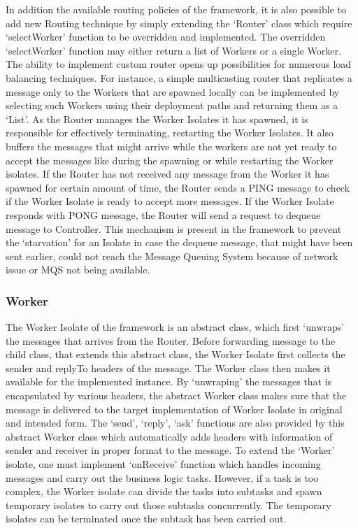     In addition the available routing policies of the framework, it is also possible to add new Routing technique by simply extending the ‘Router’ class which require ‘selectWorker’ function to be overridden and implemented. The overridden ‘selectWorker’ function may either return a list of Workers or a single Worker. The ability to implement custom router opens up possibilities for numerous load balancing techniques. For instance, a simple multicasting router that replicates a message only to the Workers that are spawned locally can be implemented by selecting such Workers using their deployment paths and returning them as a ‘List’.
    As the Router manages the Worker Isolates it has spawned, it is responsible for effectively terminating, restarting the Worker Isolates. It also buffers the messages that might arrive while the workers are not yet ready to accept the messages like during the spawning or while restarting the Worker isolates.
    If the Router has not received any message from the Worker it has spawned for certain amount of time, the Router sends a PING message to check if the Worker Isolate is ready to accept more messages. If the Worker Isolate responds with PONG message, the Router will send a request to dequeue message to Controller. This mechanism is present in the framework to prevent the ‘starvation’ for an Isolate in case the dequeue message, that might have been sent earlier, could not reach the Message Queuing System because of network issue or MQS not being available.

  \subsubsection{Worker}
  The Worker Isolate of the framework is an abstract class, which first ‘unwraps’ the messages that arrives from the Router. Before forwarding message to the child class, that extends this abstract class, the Worker Isolate first collects the sender and replyTo headers of the message. The Worker class then makes it available for the implemented instance. By ‘unwraping’ the messages that is encapsulated by various headers, the abstract Worker class makes sure that the message is delivered to the target implementation of Worker Isolate in original and intended form.
  The ‘send’, ‘reply’, ‘ask’ functions are also provided by this abstract Worker class which automatically adds headers with information of sender and receiver in proper format to the message.
  To extend the ‘Worker’ isolate, one must implement ‘onReceive’ function which handles incoming messages and carry out the business logic tasks. However, if a task is too complex, the Worker isolate can divide the tasks into subtasks and spawn temporary isolates to carry out those subtasks concurrently. The temporary isolates can be terminated once the subtask has been carried out.


